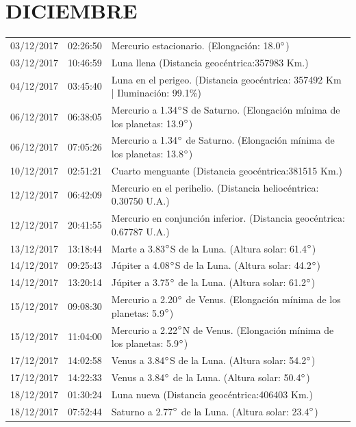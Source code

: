 \documentclass[12pt,a4paper,oneside]{article}
\begin{document}
\section{DICIEMBRE}
\begin{center}
\begin{tabular}{ |l| l| l| }
\hline
03/12/2017& 02:26:50 &	Mercurio estacionario. (Elongación: 18.0$\degree $)	\\
03/12/2017& 10:46:59 &	Luna llena (Distancia geocéntrica:357983 Km.)	\\
04/12/2017& 03:45:40 &	Luna en el perigeo. (Distancia geocéntrica: 357492 Km | Iluminación: 99.1\%)	\\
06/12/2017& 06:38:05 &	Mercurio a 1.34$\degree $S de Saturno. (Elongación mínima de los planetas: 13.9$\degree $)	\\
06/12/2017& 07:05:26 &	Mercurio a 1.34$\degree $ de Saturno. (Elongación mínima de los planetas: 13.8$\degree $)	\\
10/12/2017& 02:51:21 &	Cuarto menguante (Distancia geocéntrica:381515 Km.)	\\
12/12/2017& 06:42:09 &	Mercurio en el perihelio. (Distancia heliocéntrica: 0.30750 U.A.)	\\
12/12/2017& 20:41:55 &	Mercurio en conjunción inferior. (Distancia geocéntrica: 0.67787 U.A.)	\\
13/12/2017& 13:18:44 &	Marte a 3.83$\degree $S de la Luna. (Altura solar: 61.4$\degree $)	\\
14/12/2017& 09:25:43 &	Júpiter a 4.08$\degree $S de la Luna. (Altura solar: 44.2$\degree $)	\\
14/12/2017& 13:20:14 &	Júpiter a 3.75$\degree $ de la Luna. (Altura solar: 61.2$\degree $)	\\
15/12/2017& 09:08:30 &	Mercurio a 2.20$\degree $ de Venus. (Elongación mínima de los planetas: 5.9$\degree $)	\\
15/12/2017& 11:04:00 &	Mercurio a 2.22$\degree $N de Venus. (Elongación mínima de los planetas: 5.9$\degree $)	\\
17/12/2017& 14:02:58 &	Venus a 3.84$\degree $S de la Luna. (Altura solar: 54.2$\degree $)	\\
17/12/2017& 14:22:33 &	Venus a 3.84$\degree $ de la Luna. (Altura solar: 50.4$\degree $)	\\
18/12/2017& 01:30:24 &	Luna nueva (Distancia geocéntrica:406403 Km.)	\\
18/12/2017& 07:52:44 &	Saturno a 2.77$\degree $ de la Luna. (Altura solar: 23.4$\degree $)	\\

\end{tabular}
\end{center}
\end{document}
